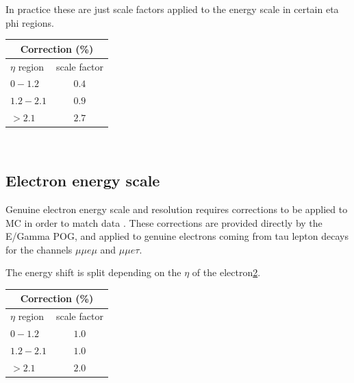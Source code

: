 In practice these are just scale factors applied to the energy scale in certain eta phi regions. \\
\begin{table}[h]
  \begin{center}
    \label{tab:MES}
    \begin{tabular} { l | c }
      \hline \multicolumn{2}{c}{Correction (\%)} \\
      \hline $\eta$ region & scale factor  \\ \hline
      $0 - 1.2$ & $0.4$ \\ 
      $1.2 - 2.1 $& $0.9 $\\ 
      $> 2.1$ & $2.7$ \\ 
    \end{tabular}
  \end{center}
\end{table}\\

\subsection{Electron energy scale}

Genuine electron energy scale and resolution requires corrections to be applied to MC in order to match data \cite{EGammaEnergyScale}. These corrections are provided directly by the E/Gamma POG, and applied to genuine electrons coming from tau lepton decays for the channels $\mu\mu e \mu$ and $\mu\mu e \tau$.

The energy shift is split depending on the $\eta$ of the electron\ref{tab:EES}.\\
\begin{table}[h]
  \begin{center}
    \label{tab:EES}
    \begin{tabular} { l | c }
      \hline \multicolumn{2}{c}{Correction (\%)} \\
      \hline $\eta$ region & scale factor  \\ \hline
      $0 - 1.2$ & $1.0$ \\ 
      $1.2 - 2.1 $& $1.0 $\\ 
      $> 2.1$ & $2.0$ \\ 
    \end{tabular}
  \end{center}
\end{table}\\

